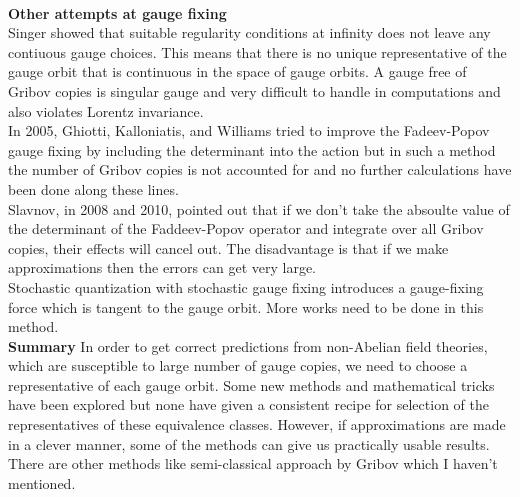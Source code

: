 \begin{description}
\\
\textbf{Other attempts at gauge fixing}\\
Singer showed that suitable regularity conditions at infinity does not leave any contiuous gauge choices. This means that there is no unique representative of the gauge orbit that is continuous in the space of gauge orbits. A gauge free of Gribov copies is singular gauge and very difficult to handle in computations and also violates Lorentz invariance.\\
In 2005, Ghiotti, Kalloniatis, and Williams tried to improve the Fadeev-Popov gauge fixing by including the determinant into the action but in such a method the number of Gribov copies is not accounted for and no further calculations have been done along these lines.\\
Slavnov, in 2008 and 2010, pointed out that if we don't take the absoulte value of the determinant of the Faddeev-Popov operator and integrate over all Gribov copies, their effects will cancel out. The disadvantage is that if we make approximations then the errors can get very large.\\
Stochastic quantization with stochastic gauge fixing introduces a gauge-fixing force which is tangent to the gauge orbit. More works need to be done in this method.
\\
\textbf{Summary}
In order to get correct predictions from non-Abelian field theories, which are susceptible to large number of gauge copies, we need to choose a representative of each gauge orbit. Some new methods and mathematical tricks have been explored but none have given a consistent recipe for selection of the representatives of these equivalence classes. However, if approximations are made in a clever manner, some of the methods can give us practically usable results. There are other methods like semi-classical approach by Gribov which I haven't mentioned.







\end{description}
\renewcommand{\ssp}{a}
